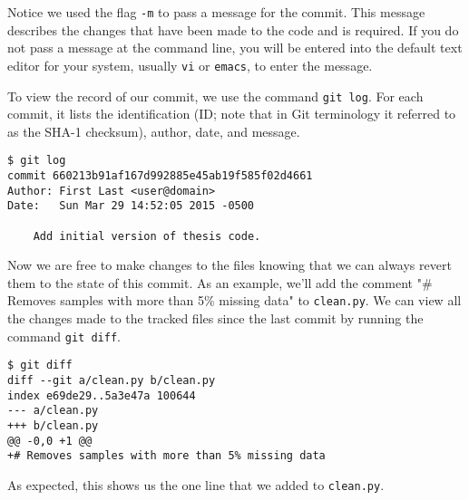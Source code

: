 Notice we used the flag \verb|-m| to pass a message for the commit.
This message describes the changes that have been made to the code and is required.
If you do not pass a message at the command line, you will be entered into the default text editor for your system, usually \verb|vi| or \verb|emacs|, to enter the message.

To view the record of our commit, we use the command \verb|git log|.
For each commit, it lists the identification (ID; note that in Git terminology it referred to as the SHA-1 checksum), author, date, and message.

\begin{lstlisting}
$ git log
commit 660213b91af167d992885e45ab19f585f02d4661
Author: First Last <user@domain>
Date:   Sun Mar 29 14:52:05 2015 -0500

    Add initial version of thesis code.
\end{lstlisting}

Now we are free to make changes to the files knowing that we can always revert them to the state of this commit.
As an example, we'll add the comment "# Removes samples with more than 5\% missing data" to \verb|clean.py|.
We can view all the changes made to the tracked files since the last commit by running the command \verb|git diff|.

\begin{lstlisting}
$ git diff
diff --git a/clean.py b/clean.py
index e69de29..5a3e47a 100644
--- a/clean.py
+++ b/clean.py
@@ -0,0 +1 @@
+# Removes samples with more than 5% missing data
\end{lstlisting}

As expected, this shows us the one line that we added to \verb|clean.py|.